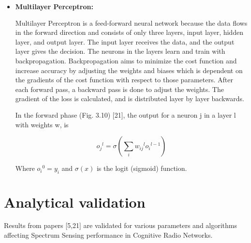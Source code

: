 \begin{itemize}
\item \textbf{Multilayer Perceptron:}

Multilayer Perceptron is a feed-forward neural network because the data flows in the forward direction and consists of only three layers, input layer, hidden layer, and output layer. The input layer receives the data, and the output layer gives the decision. The neurons in the layers learn and train with backpropagation. Backpropagation aims to minimize the cost function and increase accuracy by adjusting the weights and biases which is dependent on the gradients of the cost function with respect to those parameters. After each forward pass, a backward pass is done to adjust the weights. The gradient of the loss is calculated, and is distributed layer by layer backwards.

In the forward phase (Fig. 3.10) [21], the output for a neuron j in a layer l with weights w, is 



\begin{equation}
  {o_j}^l =\sigma \left( \sum_{i}^{} {w_{ij}}^l  {o_i}^{l-1} \right)
  \end{equation}

Where ${o_i}^0=y_i$ and $\sigma(x)$ is the logit (sigmoid) function.

\end{itemize}

\section{Analytical validation}
Results from papers [5,21] are validated for various parameters and algorithms affecting Spectrum Sensing performance in Cognitive Radio Networks.